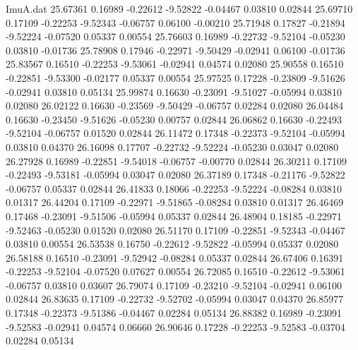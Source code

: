 \begin{filecontents}{ImuA.dat}
  25.67361    0.16989   -0.22612   -9.52822   -0.04467    0.03810    0.02844
  25.69710    0.17109   -0.22253   -9.52343   -0.06757    0.06100   -0.00210
  25.71948    0.17827   -0.21894   -9.52224   -0.07520    0.05337    0.00554
  25.76603    0.16989   -0.22732   -9.52104   -0.05230    0.03810   -0.01736
  25.78908    0.17946   -0.22971   -9.50429   -0.02941    0.06100   -0.01736
  25.83567    0.16510   -0.22253   -9.53061   -0.02941    0.04574    0.02080
  25.90558    0.16510   -0.22851   -9.53300   -0.02177    0.05337    0.00554
  25.97525    0.17228   -0.23809   -9.51626   -0.02941    0.03810    0.05134
  25.99874    0.16630   -0.23091   -9.51027   -0.05994    0.03810    0.02080
  26.02122    0.16630   -0.23569   -9.50429   -0.06757    0.02284    0.02080
  26.04484    0.16630   -0.23450   -9.51626   -0.05230    0.00757    0.02844
  26.06862    0.16630   -0.22493   -9.52104   -0.06757    0.01520    0.02844
  26.11472    0.17348   -0.22373   -9.52104   -0.05994    0.03810    0.04370
  26.16098    0.17707   -0.22732   -9.52224   -0.05230    0.03047    0.02080
  26.27928    0.16989   -0.22851   -9.54018   -0.06757   -0.00770    0.02844
  26.30211    0.17109   -0.22493   -9.53181   -0.05994    0.03047    0.02080
  26.37189    0.17348   -0.21176   -9.52822   -0.06757    0.05337    0.02844
  26.41833    0.18066   -0.22253   -9.52224   -0.08284    0.03810    0.01317
  26.44204    0.17109   -0.22971   -9.51865   -0.08284    0.03810    0.01317
  26.46469    0.17468   -0.23091   -9.51506   -0.05994    0.05337    0.02844
  26.48904    0.18185   -0.22971   -9.52463   -0.05230    0.01520    0.02080
  26.51170    0.17109   -0.22851   -9.52343   -0.04467    0.03810    0.00554
  26.53538    0.16750   -0.22612   -9.52822   -0.05994    0.05337    0.02080
  26.58188    0.16510   -0.23091   -9.52942   -0.08284    0.05337    0.02844
  26.67406    0.16391   -0.22253   -9.52104   -0.07520    0.07627    0.00554
  26.72085    0.16510   -0.22612   -9.53061   -0.06757    0.03810    0.03607
  26.79074    0.17109   -0.23210   -9.52104   -0.02941    0.06100    0.02844
  26.83635    0.17109   -0.22732   -9.52702   -0.05994    0.03047    0.04370
  26.85977    0.17348   -0.22373   -9.51386   -0.04467    0.02284    0.05134
  26.88382    0.16989   -0.23091   -9.52583   -0.02941    0.04574    0.06660
  26.90646    0.17228   -0.22253   -9.52583   -0.03704    0.02284    0.05134
\end{filecontents}
